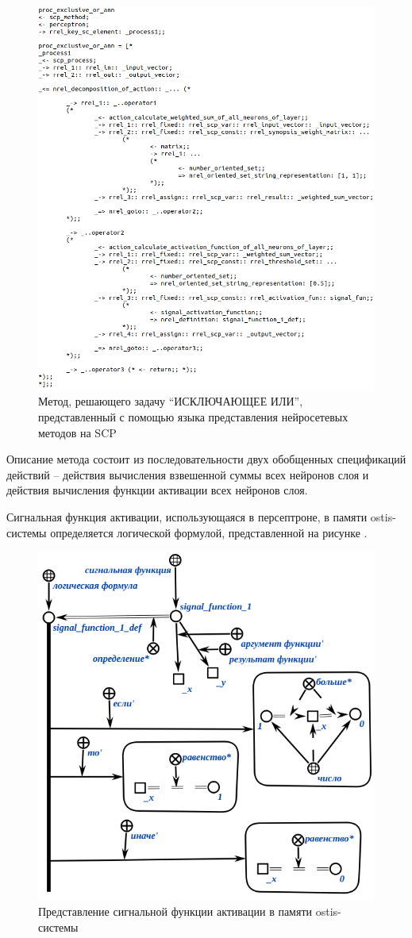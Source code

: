\begin{figure}
	\centering
	\includegraphics[width=0.95\linewidth]{author/part3/figures/exclusive_or_ann_scp.png}
	\caption{Метод, решающего задачу ``ИСКЛЮЧАЮЩЕЕ ИЛИ'', представленный с помощью языка представления нейросетевых методов на SCP}
	\label{fig:exclusive_or_ann_scp}
\end{figure}

Описание метода состоит из последовательности двух обобщенных спецификаций действий -- действия вычисления взвешенной суммы всех нейронов слоя и действия вычисления функции активации всех нейронов слоя.

Сигнальная функция активации, использующаяся в персептроне, в памяти ostis-системы определяется логической формулой, представленной на рисунке .

\begin{figure}
	\centering
	\includegraphics[width=0.5\linewidth]{author/part3/figures/signal_function_def.png}
	\caption{Представление сигнальной функции активации в памяти ostis-системы}
	\label{fig:signal_function_def}
\end{figure}

